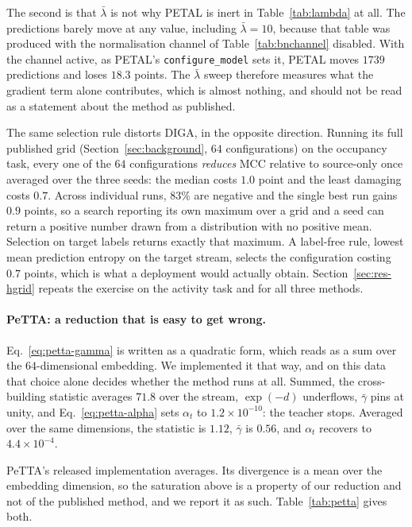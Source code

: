 \documentclass[a4paper,fleqn]{cas-dc}
\begin{document}
The second is that $\bar\lambda$ is not why PETAL is inert in Table~\ref{tab:lambda} at
all. The predictions barely move at any value, including $\bar\lambda=10$, because that
table was produced with the normalisation channel of Table~\ref{tab:bnchannel} disabled.
With the channel active, as PETAL's \texttt{configure\_model} sets it, PETAL moves $1739$
predictions and loses $18.3$ points. The $\bar\lambda$ sweep therefore measures what the
gradient term alone contributes, which is almost nothing, and should not be read as a
statement about the method as published.

The same selection rule distorts DIGA, in the opposite direction. Running its full
published grid (Section~\ref{sec:background}, $64$ configurations) on the occupancy task,
every one of the $64$ configurations \emph{reduces} MCC relative to source-only once
averaged over the three seeds: the median costs $1.0$ point and the least damaging costs
$0.7$. Across individual runs, $83\%$ are negative and the single best run gains
$0.9$ points, so a search reporting its own maximum over a grid and a seed can return a
positive number drawn from a distribution with no positive mean. Selection on target
labels returns exactly that maximum. A label-free rule, lowest mean prediction entropy
on the target stream, selects the configuration costing $0.7$ points, which is what a
deployment would actually obtain. Section~\ref{sec:res-hgrid} repeats the exercise on the
activity task and for all three methods.

\paragraph{PeTTA: a reduction that is easy to get wrong.} Eq.~\ref{eq:petta-gamma} is
written as a quadratic form, which reads as a sum over the $64$-dimensional embedding. We
implemented it that way, and on this data that choice alone decides whether the method
runs at all. Summed, the cross-building statistic averages $71.8$ over the stream, $\exp(-d)$ underflows,
$\bar\gamma$ pins at unity, and Eq.~\ref{eq:petta-alpha} sets $\alpha_t$ to
$1.2\times10^{-10}$: the teacher stops. Averaged over the same dimensions, the statistic is
$1.12$, $\bar\gamma$ is $0.56$, and $\alpha_t$ recovers to $4.4\times10^{-4}$.

PeTTA's released implementation averages. Its divergence is a mean over the embedding
dimension, so the saturation above is a property of our reduction and not of the published
method, and we report it as such. Table~\ref{tab:petta} gives both.
\end{document}
